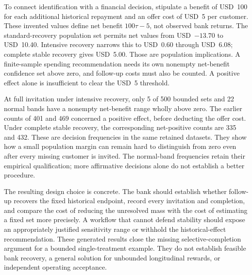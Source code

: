 To connect identification with a financial decision, stipulate a benefit of
USD~100 for each additional historical repayment and an offer cost of USD~5
per customer. These invented values define net benefit $100\tau-5$, not
observed bank returns. The standard-recovery population set permits net
values from USD~$-13.70$ to USD~10.40. Intensive recovery narrows this to
USD~0.60 through USD~6.08; complete stable recovery gives USD~5.00. Those
are population implications. A finite-sample spending recommendation needs
its own nonempty net-benefit confidence set above zero, and follow-up costs
must also be counted. A positive effect alone is insufficient to clear the
USD~5 threshold.

At full invitation under intensive recovery, only 5 of 500 bounded sets
and 22 normal bands have a nonempty net-benefit range wholly above zero.
The earlier counts of 401 and 469 concerned a positive effect, before
deducting the offer cost. Under complete stable recovery, the corresponding
net-positive counts are 335 and 432. These are decision frequencies in the
same retained datasets. They show how a small population margin can remain
hard to distinguish from zero even after every missing customer is invited. The normal-band frequencies retain their empirical qualification;
more affirmative decisions alone do not establish a better procedure.

The resulting design choice is concrete. The bank should establish whether
follow-up recovers the fixed historical endpoint, record every invitation and
completion, and compare the cost of reducing the unresolved mass with the
cost of estimating a fixed set more precisely. A workflow that cannot defend
stability should expose an appropriately justified sensitivity range or
withhold the historical-effect recommendation. These generated results close
the missing selective-completion argument for a bounded single-treatment
example. They do not establish feasible bank recovery, a general solution
for unbounded longitudinal rewards, or independent operating acceptance.

